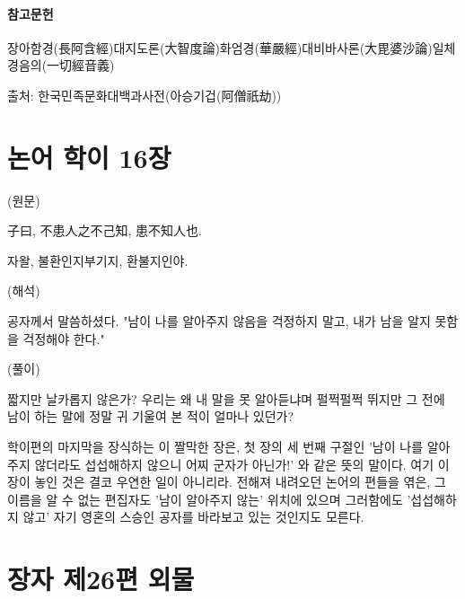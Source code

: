 \documentclass[12pt, a4paper, oneside]{book}
\let\stdsection\section
\renewcommand\section{\newpage\stdsection}
\begin{document}
 \paragraph{ 참고문헌}

        장아함경(長阿含經)대지도론(大智度論)화엄경(華嚴經)대비바사론(大毘婆沙論)일체경음의(一切經音義)


출처: 한국민족문화대백과사전(아승기겁(阿僧祇劫))


%										
	\section{ 논어 학이 16장}


(원문)

子曰, 不患人之不己知, 患不知人也.

자왈, 불환인지부기지, 환불지인야.



(해석)

공자께서 말씀하셨다. "남이 나를 알아주지 않음을 걱정하지 말고, 내가 남을 알지 못함을 걱정해야 한다."



(풀이)

 짧지만 날카롭지 않은가? 우리는 왜 내 말을 못 알아듣냐며 펄쩍펄쩍 뛰지만 그 전에 남이 하는 말에 정말 귀 기울여 본 적이 얼마나 있던가? 



 학이편의 마지막을 장식하는 이 짤막한 장은, 첫 장의 세 번째 구절인 '남이 나를 알아주지 않더라도 섭섭해하지 않으니 어찌 군자가 아닌가!' 와 같은 뜻의 말이다. 여기 이 장이 놓인 것은 결코 우연한 일이 아니리라. 전해져 내려오던 논어의 편들을 엮은, 그 이름을 알 수 없는 편집자도 '남이 알아주지 않는' 위치에 있으며 그러함에도 '섭섭해하지 않고' 자기 영혼의 스승인 공자를 바라보고 있는 것인지도 모른다. 


%										
	\section{ 장자 제26편 외물}


%										
\end{document}
